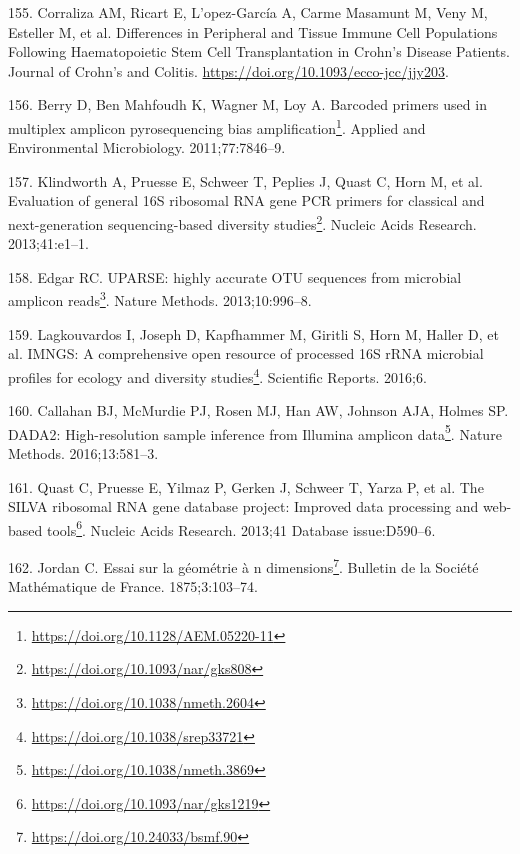 \documentclass[
  12pt,
  a4paper,
  twoside,
  openright]{book}
\DeclareRobustCommand{\href}[2]{#2\footnote{\url{#1}}}
\newlength{\cslhangindent}
\newlength{\cslentryspacingunit} %
\newenvironment{CSLReferences}[2] %
 {%
  \setlength{\parindent}{0pt}
  \ifodd #1
  \let\oldpar\par
  \def\par{\hangindent=\cslhangindent\oldpar}
  \fi
  \setlength{\parskip}{#2\cslentryspacingunit}
 }%
 {}
\begin{document}
\begin{CSLReferences}{0}{0}
\leavevmode{}%
155. Corraliza AM, Ricart E, L'opez-García A, Carme Masamunt M, Veny M, Esteller M, et al. Differences in {Peripheral} and {Tissue Immune Cell Populations Following Haematopoietic Stem Cell Transplantation} in {Crohn}'s {Disease Patients}. Journal of Crohn's and Colitis. \url{https://doi.org/10.1093/ecco-jcc/jjy203}.

\leavevmode{}%
156. Berry D, Ben Mahfoudh K, Wagner M, Loy A. \href{https://doi.org/10.1128/AEM.05220-11}{Barcoded primers used in multiplex amplicon pyrosequencing bias amplification}. Applied and Environmental Microbiology. 2011;77:7846--9.

\leavevmode{}%
157. Klindworth A, Pruesse E, Schweer T, Peplies J, Quast C, Horn M, et al. \href{https://doi.org/10.1093/nar/gks808}{Evaluation of general 16S ribosomal RNA gene PCR primers for classical and next-generation sequencing-based diversity studies}. Nucleic Acids Research. 2013;41:e1--1.

\leavevmode{}%
158. Edgar RC. \href{https://doi.org/10.1038/nmeth.2604}{UPARSE: highly accurate OTU sequences from microbial amplicon reads}. Nature Methods. 2013;10:996--8.

\leavevmode{}%
159. Lagkouvardos I, Joseph D, Kapfhammer M, Giritli S, Horn M, Haller D, et al. \href{https://doi.org/10.1038/srep33721}{IMNGS: A comprehensive open resource of processed 16S rRNA microbial profiles for ecology and diversity studies}. Scientific Reports. 2016;6.

\leavevmode{}%
160. Callahan BJ, McMurdie PJ, Rosen MJ, Han AW, Johnson AJA, Holmes SP. \href{https://doi.org/10.1038/nmeth.3869}{DADA2: High-resolution sample inference from Illumina amplicon data}. Nature Methods. 2016;13:581--3.

\leavevmode{}%
161. Quast C, Pruesse E, Yilmaz P, Gerken J, Schweer T, Yarza P, et al. \href{https://doi.org/10.1093/nar/gks1219}{The SILVA ribosomal RNA gene database project: Improved data processing and web-based tools}. Nucleic Acids Research. 2013;41 Database issue:D590--6.

\leavevmode{}%
162. Jordan C. \href{https://doi.org/10.24033/bsmf.90}{Essai sur la géométrie à n dimensions}. Bulletin de la Société Mathématique de France. 1875;3:103--74.


\end{CSLReferences}
\end{document}
